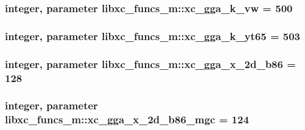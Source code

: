 \hypertarget{classlibxc__funcs__m_ae7cbe5f41b864af681ffea0a07ad6a37}{
\subsubsection[{xc\-\_\-gga\-\_\-k\-\_\-vw}]{\setlength{\rightskip}{0pt plus 5cm}integer, parameter libxc\-\_\-funcs\-\_\-m\-::xc\-\_\-gga\-\_\-k\-\_\-vw = 500}}\label{classlibxc__funcs__m_ae7cbe5f41b864af681ffea0a07ad6a37}
\hypertarget{classlibxc__funcs__m_a34ce616ab8d5b41e5c47367d78352aa5}{
\subsubsection[{xc\-\_\-gga\-\_\-k\-\_\-yt65}]{\setlength{\rightskip}{0pt plus 5cm}integer, parameter libxc\-\_\-funcs\-\_\-m\-::xc\-\_\-gga\-\_\-k\-\_\-yt65 = 503}}\label{classlibxc__funcs__m_a34ce616ab8d5b41e5c47367d78352aa5}
\hypertarget{classlibxc__funcs__m_af2e15afb1fd6df4d06cd7f9d1c13129a}{
\subsubsection[{xc\-\_\-gga\-\_\-x\-\_\-2d\-\_\-b86}]{\setlength{\rightskip}{0pt plus 5cm}integer, parameter libxc\-\_\-funcs\-\_\-m\-::xc\-\_\-gga\-\_\-x\-\_\-2d\-\_\-b86 = 128}}\label{classlibxc__funcs__m_af2e15afb1fd6df4d06cd7f9d1c13129a}
\hypertarget{classlibxc__funcs__m_a10f09a249e6a83a164f8b898eec0f1af}{
\subsubsection[{xc\-\_\-gga\-\_\-x\-\_\-2d\-\_\-b86\-\_\-mgc}]{\setlength{\rightskip}{0pt plus 5cm}integer, parameter libxc\-\_\-funcs\-\_\-m\-::xc\-\_\-gga\-\_\-x\-\_\-2d\-\_\-b86\-\_\-mgc = 124}}\label{classlibxc__funcs__m_a10f09a249e6a83a164f8b898eec0f1af}
